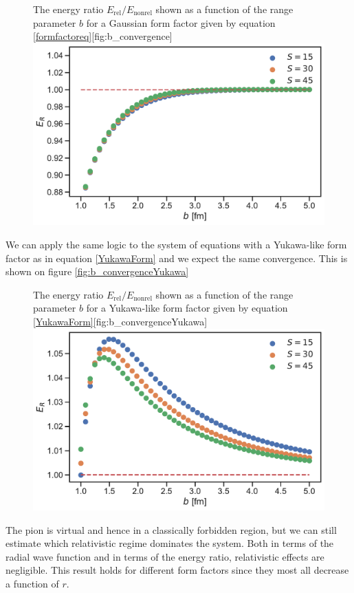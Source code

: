 \begin{figure}[H]
	\begin{sidecaption}{The energy ratio $E_\text{rel}/E_\text{nonrel}$ shown as a function of the range parameter $b$ for a Gaussian form factor given by equation \eqref{formfactoreq}}[fig:b_convergence]
		\includegraphics[width=\linewidth]{Figures/bconvergence.pdf}
	\end{sidecaption}
\end{figure}
We can apply the same logic to the system of equations with a Yukawa-like form factor as in equation \eqref{YukawaForm} and we expect the same convergence. This is shown on figure \ref{fig:b_convergenceYukawa}
\begin{figure}[H]
	\begin{sidecaption}{The energy ratio $E_\text{rel}/E_\text{nonrel}$ shown as a function of the range parameter $b$ for a Yukawa-like form factor given by equation \eqref{YukawaForm}}[fig:b_convergenceYukawa]
		\includegraphics[width=\linewidth]{Figures/bconvergenceYukawa.pdf}
	\end{sidecaption}
\end{figure}
The pion is virtual and hence in a classically forbidden region, but we can still estimate which relativistic regime dominates the system. Both in terms of the radial wave function and in terms of the energy ratio, relativistic effects are negligible. This result holds for different form factors since they most all decrease a function of $r$. 

